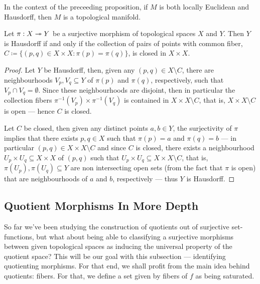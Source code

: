 \begin{corollary}
\label{cor:manifold-from-quotient}
In the context of the preceeding proposition, if \(M\) is both locally Euclidean
and Hausdorff, then \(M\) is a topological manifold.
\end{corollary}

\begin{proposition}
\label{prop:open-quotient-hausdorff}
Let \(\pi: X \twoheadrightarrow Y\) be a surjective morphism of topological spaces \(X\) and
\(Y\). Then \(Y\) is Hausdorff if and only if the collection of pairs of points
with common fiber, \(C \coloneqq \{(p, q) \in X \times X \colon \pi(p) = \pi(q)\}\),
is closed in \(X \times X\).
\end{proposition}

\begin{proof}
Let \(Y\) be Hausdorff, then, given any \((p, q) \in X \setminus C\), there are
neighbourhoods \(V_p, V_q \subseteq Y\) of \(\pi(p)\) and \(\pi(q)\),
respectively, such that \(V_p \cap V_q = \emptyset\). Since these neighbourhoods
are disjoint, then in particular the collection fibers \(\pi^{-1}(V_p) \times
\pi^{-1}(V_q)\) is contained in \(X \times X \setminus C\), that is, \(X \times
X \setminus C\) is open --- hence \(C\) is closed.

Let \(C\) be closed, then given any distinct points \(a, b \in Y\), the
surjectivity of \(\pi\) implies that there exists \(p, q \in X\) such that
\(\pi(p) = a\) and \(\pi(q) = b\) --- in particular \((p, q) \in X \times X
\setminus C\) and since \(C\) is closed, there exists a neighbourhood \(U_p
\times U_q \subseteq X \times X\) of \((p, q)\) such that \(U_p \times U_q
\subseteq X \times X \setminus C\), that is, \(\pi(U_p), \pi(U_q) \subseteq Y\)
are non intersecting open sets (from the fact that \(\pi\) is open) that are
neighbourhoods of \(a\) and \(b\), respectively --- thus \(Y\) is Hausdorff.
\end{proof}

\subsection{Quotient Morphisms In More Depth}

So far we've been studying the construction of quotients out of surjective
set-functions, but what about being able to classifying a surjective morphisms
between given topological spaces as inducing the universal property of the
quotient space? This will be our goal with this subsection --- identifying
quotienting morphisms. For that end, we shall profit from the main idea behind
quotients: fibers. For that, we define a set given by fibers of \(f\) as being
saturated.

